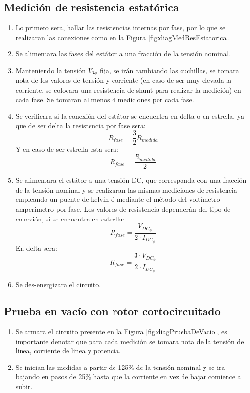 \documentclass[11pt,letterpaper]{article}     %
\begin{document}
\subsection{Medición de resistencia estatórica}
\begin{enumerate}
	\item Lo primero sera, hallar las resistencias internas por fase, por lo que se realizaran las conexiones como en la Figura \ref{fig:diagMedResEstatorica}.
	\item Se alimentara las fases del estátor a una fracción de la tensión nominal.
	\item Manteniendo la tensión $V_{3\phi}$ fija, se irán cambiando las cuchillas, se tomara nota de los valores de tensión y corriente (en caso de ser muy elevada la corriente, se colocara una resistencia de shunt para realizar la medición) en cada fase. Se tomaran al menos 4 mediciones por cada fase.
	\item Se verificara si la conexión del estátor se encuentra en delta o en estrella, ya que de ser delta la resistencia por fase sera:
	\begin{equation}
		R_{fase} = \frac{3}{2}R_{medida}
	\end{equation}
	Y en caso de ser estrella esta sera:
	\begin{equation}
		R_{fase} = \frac{R_{medida}}{2}
	\end{equation}
	\item Se alimentara el estátor a una tensión DC, que corresponda con una fracción de la tensión nominal y se realizaran las mismas mediciones de resistencia empleando un puente de kelvin ó mediante el método del voltímetro-amperímetro por fase. Los valores de resistencia dependerán del tipo de conexión, si se encuentra en estrella:
	\begin{equation}
	R_{fase} = \frac{V_{DC_{\phi}}}{2\cdot I_{DC_{\phi}}}
	\end{equation} 
	En delta sera:
	\begin{equation}
	R_{fase} = \frac{3\cdot V_{DC_{\phi}}}{2\cdot I_{DC_{\phi}}}
	\end{equation} 
	\item Se des-energizara el circuito.
\end{enumerate}
\subsection{Prueba en vacío con rotor cortocircuitado}
\begin{enumerate}
	\item Se armara el circuito presente en la Figura \ref{fig:diagPruebaDeVacio}, es importante denotar que para cada medición se tomara nota de la tensión  de linea, corriente de linea y potencia.
	\item Se inician las medidas a partir de 125\% de la tensión nominal y se ira bajando en pasos de 25\% hasta que la corriente en vez de bajar comience a subir.
\end{enumerate}
\end{document}
